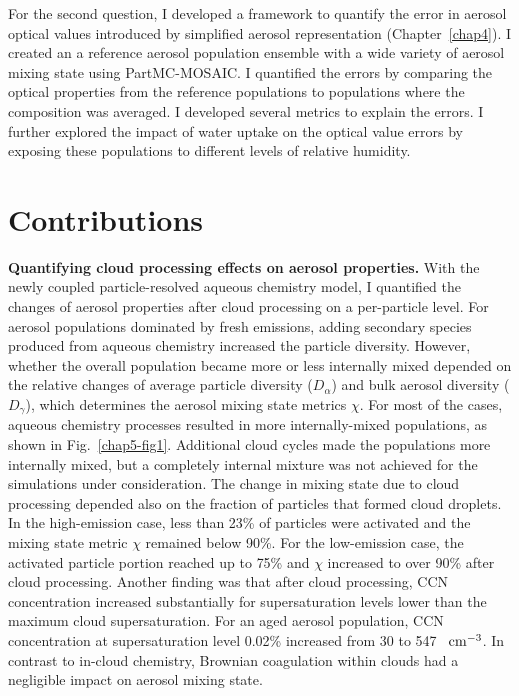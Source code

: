 \documentclass[edeposit,fullpage]{uiucthesis2009}
\makeatletter
\DeclareRobustCommand*\unit[1]
 {\ensuremath{%
   {\thinmuskip3mu\relax
    \def\mu{\text{\textmu}}\def~{\,}%
    \ifx\f@series\testbx\mathbf{#1}\else\mathrm{#1}\fi}}}
\makeatother
\begin{document}
For the second question, I developed a framework to quantify the error
in aerosol optical values introduced by simplified aerosol
representation (Chapter~\ref{chap4}). I created an a reference aerosol
population ensemble with a wide variety of aerosol mixing state using
PartMC-MOSAIC. I quantified the errors by comparing the optical
properties from the reference populations to populations where the
composition was averaged. I developed several metrics to explain the
errors. I further explored the impact of water uptake on the optical
value errors by exposing these populations to different levels of
relative humidity.

\section{Contributions}
{\bf Quantifying cloud processing effects on aerosol properties.} With
the newly coupled particle-resolved aqueous chemistry model, I
quantified the changes of aerosol properties after cloud processing on
a per-particle level. For aerosol populations dominated by fresh
emissions, adding secondary species produced from aqueous chemistry
increased the particle diversity. However, whether the overall
population became more or less internally mixed depended on the
relative changes of average particle diversity ($D_{\alpha}$) and bulk
aerosol diversity ($D_{\gamma}$), which determines the aerosol mixing
state metrics $\chi$. For most of the cases, aqueous chemistry
processes resulted in more internally-mixed populations, as shown in
Fig.~\ref{chap5-fig1}. Additional cloud cycles made the populations
more internally mixed, but a completely internal mixture was not
achieved for the simulations under consideration. The change in mixing
state due to cloud processing depended also on the fraction of
particles that formed cloud droplets. In the high-emission case, less
than 23\% of particles were activated and the mixing state metric
$\chi$ remained below 90\%. For the low-emission case, the activated
particle portion reached up to 75\% and $\chi$ increased to over 90\%
after cloud processing. Another finding was that after cloud
processing, CCN concentration increased substantially for
supersaturation levels lower than the maximum cloud
supersaturation. For an aged aerosol population, CCN concentration at
supersaturation level 0.02\% increased from 30 to 547
~\unit{cm^{-3}}. In contrast to in-cloud chemistry, Brownian coagulation within
clouds had a negligible impact on aerosol mixing state.
\end{document}

